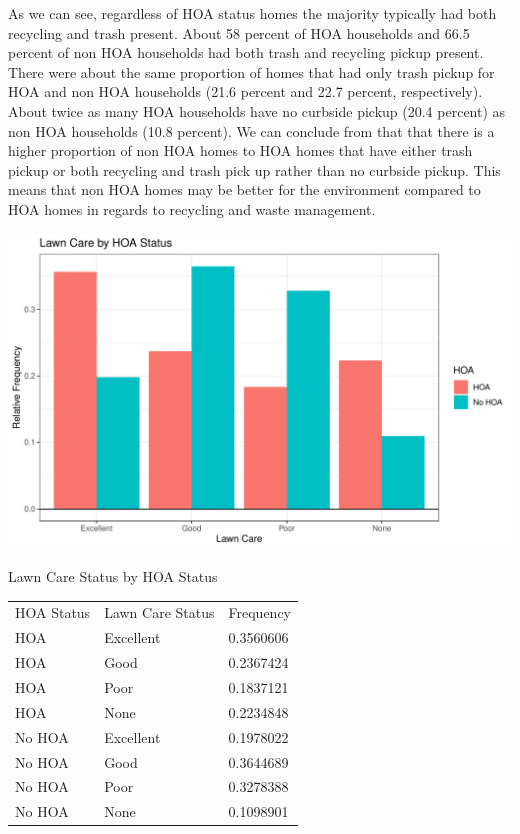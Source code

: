 \documentclass{article}
\begin{document}
As we can see, regardless of HOA status homes the majority typically had both recycling and trash present. About 58 percent of HOA households and 66.5 percent of non HOA households had both trash and recycling pickup present. There were about the same proportion of homes that had only trash pickup for HOA and non HOA households (21.6 percent and 22.7 percent, respectively). About twice as many HOA households have no curbside pickup (20.4 percent) as non HOA households (10.8 percent). We can conclude from that that there is a higher proportion of non HOA homes to HOA homes that have either trash pickup or both recycling and trash pick up rather than no curbside pickup. This means that non HOA homes may be better for the environment compared to HOA homes in regards to recycling and waste management.


\newpage
\includegraphics{exam1-009}

\begin{center} Lawn Care Status by HOA Status \end{center}
\begin{table}[h]
\begin{tabular}{lll}
HOA Status & Lawn Care Status & Frequency      \\
HOA    & Excellent         & 0.3560606 \\
HOA    & Good         & 0.2367424 \\
HOA    & Poor         & 0.1837121 \\
HOA    & None         & 0.2234848 \\
No HOA & Excellent         & 0.1978022 \\
No HOA & Good         & 0.3644689 \\
No HOA & Poor         & 0.3278388 \\
No HOA & None         & 0.1098901
\end{tabular}
\end{table}
\end{document}
